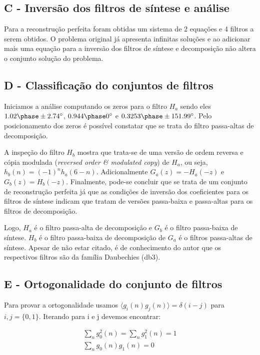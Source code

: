 \documentclass{article}
\begin{document}
\subsection*{C - Inversão dos filtros de síntese e análise}
Para a reconstrução perfeita foram obtidas um sistema de 2 equações e 4 filtros a serem obtidos. O problema original já apresenta infinitas soluções e ao adicionar mais uma equação para a inversão dos filtros de síntese e decomposição não altera o conjunto solução do problema.

\subsection*{D - Classificação do conjuntos de filtros}
Iniciamos a análise computando os zeros para o filtro $H_a$ sendo eles $1.02 \phase \pm 2.74^{\circ}$, $0.944 \phase 0^{\circ}$ e $0.3253 \phase \pm 151.99^{\circ}$. Pelo posicionamento dos zeros é possível constatar que se trata do filtro passa-altas de decomposição.

A inspeção do filtro $H_b$ mostra que trata-se de uma versão de ordem reversa e cópia modulada (\textit{reversed order \& modulated copy}) de $H_a$, ou seja, $h_b(n) = (-1)^n h_a(6-n)$. Adicionalmente $G_a(z) = -H_a(-z)$ e $G_b(z) = H_b(-z)$. Finalmente, pode-se concluir que se trata de um conjunto de reconstrução perfeita já que as condições de inversão dos coeficientes para os filtros de síntese indicam que tratam de versões passa-baixa e passa-altas para os filtros de decomposição.

Logo, $H_a$ é o filtro passa-alta de decomposição e $G_b$ é o filtro passa-baixa de síntese. $H_b$ é o filtro passa-baixa de decomposição de $G_a$ é o filtros passa-altas de síntese. Apesar de não estar citado, é de conhecimento do autor que os respectivos filtros são da família Daubechies (db3).

\subsection*{E - Ortogonalidade do conjunto de filtros}
Para provar a ortogonalidade usamos $\langle g_i(n)g_j(n) \rangle = \delta(i-j)$ para $i,j =\{0,1\}$. Iterando para i e j devemos encontrar:

\begin{equation}
\begin{split}
\sum_{n}^{} g_0^2(n) = \sum_{n}^{} g_1^2(n) = 1 \\
\sum_{n}^{} g_0(n)g_1(n) = 0
\end{split}
\end{equation}
\end{document}
